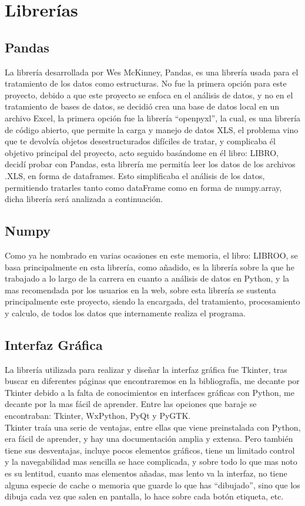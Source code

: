 \section{Librerías}
\subsection{Pandas}
La librería desarrollada por Wes McKinney, Pandas, es una librería usada para el tratamiento de los datos como estructuras. No fue la primera opción para este proyecto, debido a que este proyecto se enfoca en el análisis de datos, y no en el tratamiento de bases de datos, se decidió crea una base de datos local en un archivo Excel, la primera opción fue la librería “openpyxl”, la cual, es una librería de código abierto, que permite la carga y manejo de datos XLS, el problema vino que te devolvía objetos desestructurados difíciles de tratar, y complicaba él objetivo principal del proyecto, acto seguido basándome en él libro: LIBRO, decidí probar con Pandas, esta librería me permitía leer los datos de los archivos .XLS, en forma de dataframes. Esto simplificaba el análisis de los datos, permitiendo tratarles tanto como dataFrame como en forma de numpy.array, dicha librería será analizada a continuación.
\subsection{Numpy}
Como ya he nombrado en varias ocasiones en este memoria, el libro: LIBROO, se basa principalmente en esta librería, como añadido, es la librería sobre la que he trabajado a lo largo de la carrera en cuanto a análisis de datos en Python, y la mas recomendada por los usuarios en la web, sobre esta librería se sustenta principalmente este proyecto, siendo la encargada, del tratamiento, procesamiento y calculo, de todos los datos que internamente realiza el programa.
\subsection{Interfaz Gráfica}
La librería utilizada para realizar y diseñar la interfaz gráfica fue Tkinter, tras buscar en diferentes páginas que encontraremos en la bibliografía, me decante por Tkinter debido a la falta de conocimientos en interfaces gráficas con Python, me decante por la mas fácil de aprender. Entre las opciones que baraje se encontraban: Tkinter, WxPython, PyQt y PyGTK.\\

Tkinter traía una serie de ventajas, entre ellas que viene preinstalada con Python, era fácil de aprender, y hay una documentación amplia y extensa. Pero también tiene sus desventajas, incluye pocos elementos gráficos, tiene un limitado control y la navegabilidad mas sencilla se hace complicada, y sobre todo lo que mas noto es su lentitud, cuanto mas elementos añadas, mas lento va la interfaz, no tiene alguna especie de cache o memoria que guarde lo que has “dibujado”, sino que los dibuja cada vez que salen en pantalla, lo hace sobre cada botón etiqueta, etc.\\

